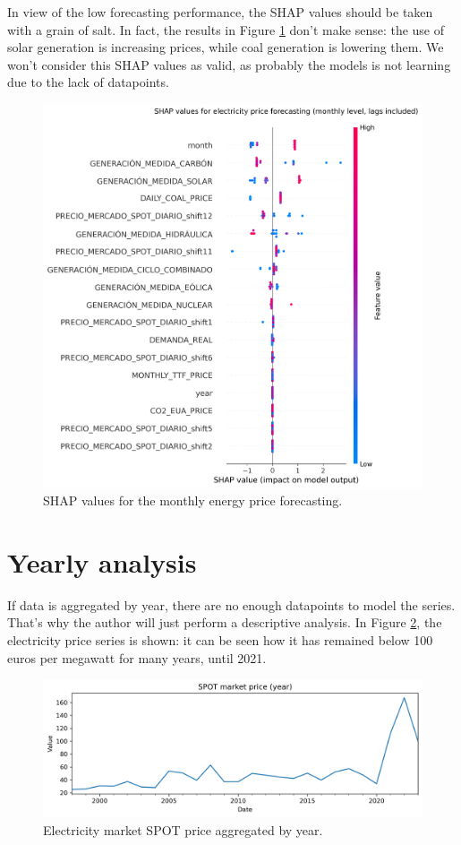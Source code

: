 In view of the low forecasting performance, the SHAP values should be taken with a grain of salt. In fact, the results in Figure \ref{fig:shap-monthly} don't make sense: the use of solar generation is increasing prices, while coal generation is lowering them. We won't consider this SHAP values as valid, as probably the models is not learning due to the lack of datapoints.

\begin{figure}[H]
\centering
    \centering
    \includegraphics[width=0.7\linewidth]{images/analysis/shap-monthly}
    \caption{SHAP values for the monthly energy price forecasting.}
    \label{fig:shap-monthly}
\end{figure}

\newpage
\section{Yearly analysis}

If data is aggregated by year, there are no enough datapoints to model the series. That's why the author will just perform a descriptive analysis. In Figure \ref{fig:spot-yearly}, the electricity price series is shown: it can be seen how it has remained below 100 euros per megawatt for many years, until 2021.

\begin{figure}[H]
\centering
    \centering
    \includegraphics[width=0.7\linewidth]{images/analysis/spot-yearly}
    \caption{Electricity market SPOT price aggregated by year.}
    \label{fig:spot-yearly}
\end{figure}

